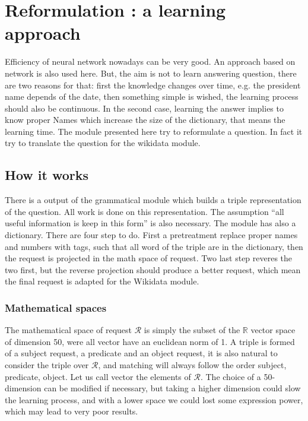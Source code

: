 \section{Reformulation : a learning approach }
\label{mlreformulation}

Efficiency of neural network nowadays can be very good. An approach based on network is also used here. But, the aim is not to learn answering question, there are two reasons for that: first the knowledge changes over time, e.g. the president name depends of the date, then something simple is wished, the learning process should also be continuous. In the second case, learning the answer implies to know proper Names which increase the size of the dictionary, that means the learning time. The module presented here try to reformulate a question. In fact it try to translate the question for the wikidata module.

\subsection{How it works}

There is a output of the grammatical module which builds a triple representation of the question. All work is done on this representation. The assumption ``all useful information is keep in this form''  is also necessary. The module has also a dictionary. There are four step to do. First a pretreatment replace proper names and numbers with tags, such that all word of the triple are in the dictionary, then the request is projected in the math space of request. Two last step reveres the two first, but the reverse projection should produce a better request, which mean the final request is adapted for the Wikidata module.

\subsubsection{Mathematical spaces}

The mathematical space of request $\mathcal{R}$ is simply the subset of the $\mathbb{R}$ vector space of dimension 50, were all vector have an euclidean norm of 1.
A triple is formed of a subject request, a predicate and an object request, it is also natural to consider the triple over $\mathcal{R}$, and matching will always follow the order subject, predicate, object.
Let us call vector the elements of $\mathcal{R}$.
The choice of a 50-dimension can be modified if necessary, but taking a higher dimension could slow the learning process, and with a lower space we could lost some expression power, which may lead to very poor results.

